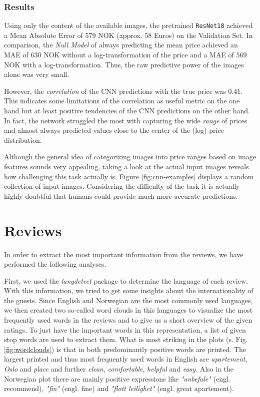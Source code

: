 \documentclass[12pt, letterpaper]{article}
\begin{document}
\subsubsection{Results}

Using only the content of the available images, the pretrained \texttt{ResNet18} achieved a Mean Absolute Error of $579$ NOK (approx. $58$ Euros) on the Validation Set.
In comparison, the \emph{Null Model} of always predicting the mean price achieved an MAE of $630$ NOK without a log-transformation of the price and a MAE of $569$ NOK with a log-transformation.
Thus, the raw predictive power of the images alone was very small.

However, the \emph{correlation} of the CNN predictions with the true price was $0.41$.
This indicates some limitations of the correlation as useful metric on the one hand but at least positive tendencies of the CNN predictions on the other hand.
In fact, the network struggled the most with capturing the wide \emph{range} of prices and almost always predicted values close to the center of the (log) price distribution.

Although the general idea of categorizing images into price ranges based on image features sounds very appealing, taking a look at the actual input images reveals how challenging this task actually is.
Figure \ref{fig:cnn-examples} displays a random collection of input images.
Considering the difficulty of the task it is actually highly doubtful that humans could provide much more accurate predictions.

\section{Reviews}

In order to extract the most important information from the reviews, we have performed the following analyses.

First, we used the \textit{langdetect} package to determine the language of each review. 
With this information, we tried to get some insights about the internationality of the guests. 
Since English and Norwegian are the most commonly used languages, we then created two so-called word clouds in this languages 
to visualize the most frequently used words in the reviews and to give us a short overview of the given ratings.
To just have the important words in this representation, a list of given stop words are used to extract them. 
What is most striking in the plots (s. Fig. \ref{fig:wordclouds}) is that in both predominantly positive words are printed. The largest printed and thus most frequently used words in English are \textit{apartement}, \textit{Oslo} and \textit{place} and 
further \textit{clean}, \textit{comfortable}, \textit{helpful} and \textit{easy}. Also in the Norwegian plot there are mainly positive expressions like \textit{"anbefale"} (engl. recommend), \textit{"fin"} (engl. fine) and \textit{"flott leilighet"} (engl. great apartement).
\end{document}
